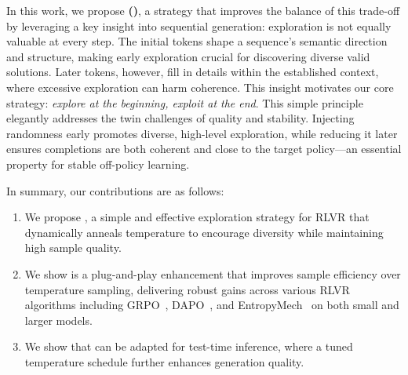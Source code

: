 In this work, we propose \textbf{\algname (\alg)}, a strategy that improves the balance of this trade-off by leveraging a key insight into sequential generation: exploration is not equally valuable at every step.
%
The initial tokens shape a sequence's semantic direction and structure, making early exploration crucial for discovering diverse valid solutions. 
%
Later tokens, however, fill in details within the established context, where excessive exploration can harm coherence.
%
This insight motivates our core strategy: \textit{explore at the beginning, exploit at the end}. 
%
This simple principle elegantly addresses the twin challenges of quality and stability. 
%
Injecting randomness early promotes diverse, high-level exploration, while reducing it later ensures completions are both coherent and close to the target policy---an essential property for stable off-policy learning.

In summary, our contributions are as follows:
\begin{enumerate}[wide, labelwidth=!, labelindent=0pt, nosep]
    \item[\circone] We propose \alg, a simple and effective exploration strategy for RLVR that dynamically anneals temperature to encourage diversity while maintaining high sample quality.
    \item[\circtwo] We show \alg is a plug-and-play enhancement that improves sample efficiency over temperature sampling, delivering robust gains across various RLVR algorithms including GRPO~\citep{shao2024deepseekmath}, DAPO~\citep{yu2025dapo}, and EntropyMech~\citep{cui2025entropy} on both small and larger models.
    \item[\circthree] We show that \alg can be adapted for test-time inference, where a tuned temperature schedule further enhances generation quality.
\end{enumerate}
